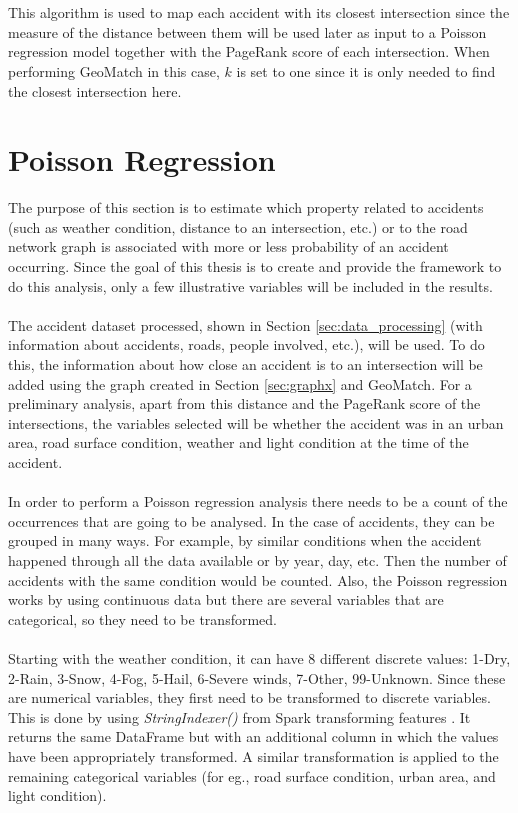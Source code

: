 \\
\\
This algorithm is used to map each accident with its closest intersection since the measure of the distance between them will be used later as input to a Poisson regression model together with the PageRank score of each intersection. When performing GeoMatch in this case, $k$ is set to one since it is only needed to find the closest intersection here. 

\section{Poisson Regression} \label{sec:regresion}

The purpose of this section is to estimate which property related to accidents (such as weather condition, distance to an intersection, etc.) or to the road network graph is associated with more or less probability of an accident occurring. Since the goal of this thesis is to create and provide the framework to do this analysis, only a few illustrative variables will be included in the results. 
\\
\\
The accident dataset processed, shown in Section \ref{sec:data_processing} (with information about accidents, roads, people involved, etc.), will be used. To do this, the information about how close an accident is to an intersection will be added using the graph created in Section \ref{sec:graphx} and GeoMatch. For a preliminary analysis, apart from this distance and the PageRank score of the intersections, the variables selected will be whether the accident was in an urban area, road surface condition, weather and light condition at the time of the accident.
\\
\\
In order to perform a Poisson regression analysis there needs to be a count of the occurrences that are going to be analysed. In the case of accidents, they can be grouped in many ways. For example, by similar conditions when the accident happened through all the data available or by year, day, etc. Then the number of accidents with the same condition would be counted. Also, the Poisson regression works by using continuous data but there are several variables that are categorical, so they need to be transformed.
\\
\\
Starting with the weather condition, it can have 8 different discrete values: 1-Dry, 2-Rain, 3-Snow, 4-Fog, 5-Hail, 6-Severe winds, 7-Other, 99-Unknown. Since these are numerical variables, they first need to be transformed to discrete variables. This is done by using \textit{StringIndexer()} from Spark transforming features \cite{sparktransform}. It returns the same DataFrame but with an additional column in which the values have been appropriately transformed. A similar transformation is applied to the remaining categorical variables (for eg., road surface condition, urban area, and light condition).\\
